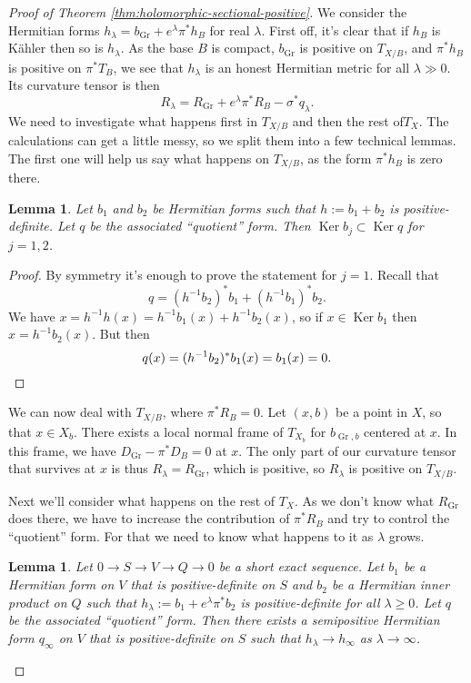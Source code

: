 \documentclass[10pt,a4paper]{amsart}
\newtheorem{lemm}[theo]{Lemma}
\theoremstyle{definition}
\DeclareMathOperator{\Gr}{Gr}
\DeclareMathOperator{\Ker}{Ker}
\begin{document}
\begin{proof}[Proof of Theorem \ref{thm:holomorphic-sectional-positive}]
We consider the Hermitian forms $h_{\lambda} = b_{\Gr} + e^{\lambda} \pi^{*} h_{B}$ for real $\lambda$.
First off, it's clear that if $h_{B}$ is K\"ahler then so is $h_{\lambda}$.
As the base $B$ is compact, $b_{\Gr}$ is positive on $T_{X/B}$, and $\pi^{*}h_{B}$ is positive on $\pi^{*}T_{B}$, we see that $h_{\lambda}$ is an honest Hermitian metric for all $\lambda \gg 0$.
Its curvature tensor is then
\[
  R_{\lambda}
  = R_{\Gr} + e^{\lambda}\pi^{*}R_{B} - \sigma^{*}q_{\lambda}.
\]
We need to investigate what happens first in $T_{X/B}$ and then the rest of$T_{X}$.
The calculations can get a little messy, so we split them into a few technical lemmas.
The first one will help us say what happens on $T_{X/B}$, as the form $\pi^{*}h_{B}$ is zero there.


\begin{lemm}
Let $b_{1}$ and $b_{2}$ be Hermitian forms such that $h := b_{1} + b_{2}$ is positive-definite.
Let $q$ be the associated ``quotient'' form.
Then $\Ker b_{j} \subset \Ker q$ for $j = 1,2$.
\end{lemm}

\begin{proof}
By symmetry it's enough to prove the statement for $j = 1$.
Recall that
\[
  q = (h^{-1}b_{2})^{*}b_{1} + (h^{-1}b_{1})^{*}b_{2}.
\]
We have $x = h^{-1}h(x) = h^{-1}b_{1}(x) + h^{-1}b_{2}(x)$, so if $x \in \Ker b_{1}$ then $x = h^{-1}b_{2}(x)$.
But then
\begin{equation*}
q(x) = (h^{-1}b_{2})^{*}b_{1}(x) = b_{1}(x) = 0.
\qedhere
\end{equation*}
\end{proof}

We can now deal with $T_{X/B}$, where $\pi^*R_B = 0$.
Let $(x,b)$ be a point in $X$, so that $x \in X_b$.
There exists a local normal frame of $T_{X_b}$ for $b_{\Gr,b}$ centered at $x$.
In this frame, we have $D_{\Gr} - \pi^* D_B = 0$ at $x$.
The only part of our curvature tensor that survives at $x$ is thus
$R_\lambda = R_{\Gr}$,
which is positive, so $R_\lambda$ is positive on $T_{X/B}$.

Next we'll consider what happens on the rest of $T_{X}$.
As we don't know what $R_{\Gr}$ does there, we have to increase the contribution of $\pi^{*}R_{B}$ and try to control the ``quotient'' form.
For that we need to know what happens to it as $\lambda$ grows.



\begin{lemm}
Let $0 \to S \to V \to Q \to 0$ be a short exact sequence.
Let $b_{1}$ be a Hermitian form on $V$ that is positive-definite on $S$ and $b_{2}$ be a Hermitian inner product on $Q$ such that $h_{\lambda} := b_{1} + e^{\lambda} \pi^{*} b_{2}$ is positive-definite for all $\lambda \geq 0$.
Let $q$ be the associated ``quotient'' form.
Then there exists a semipositive Hermitian form $q_{\infty}$ on $V$ that is positive-definite on $S$ such that $h_{\lambda} \to h_{\infty}$ as $\lambda \to \infty$.
\end{lemm}



\end{proof}
\end{document}
